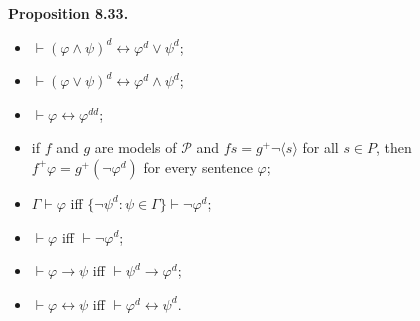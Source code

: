 \textbf{Proposition 8.33.}

\begin{itemize}
  \item[(i)] $\vdash (\varphi \wedge \psi)^{d} \leftrightarrow \varphi^{d} \vee \psi^{d}$;
  \item[(ii)] $\vdash (\varphi \vee \psi)^{d} \leftrightarrow \varphi^{d} \wedge \psi^{d}$;
  \item[(iii)] $\vdash \varphi \leftrightarrow \varphi^{dd}$;
  \item[(iv)] if $f$ and $g$ are models of $\mathcal{P}$ and $fs = g^{+} \neg \langle s \rangle$ for all $s \in P$, then $f^{+} \varphi = g^{+} (\neg \varphi^{d})$ for every sentence $\varphi$;
  \item[(v)] $\Gamma \vdash \varphi$ iff $\{\neg \psi^{d} : \psi \in \Gamma\} \vdash \neg \varphi^{d}$;
  \item[(vi)] $\vdash \varphi$ iff $\vdash \neg \varphi^{d}$;
  \item[(vii)] $\vdash \varphi \rightarrow \psi$ iff $\vdash \psi^{d} \rightarrow \varphi^{d}$;
  \item[(viii)] $\vdash \varphi \leftrightarrow \psi$ iff $\vdash \varphi^{d} \leftrightarrow \psi^{d}$.
\end{itemize}
